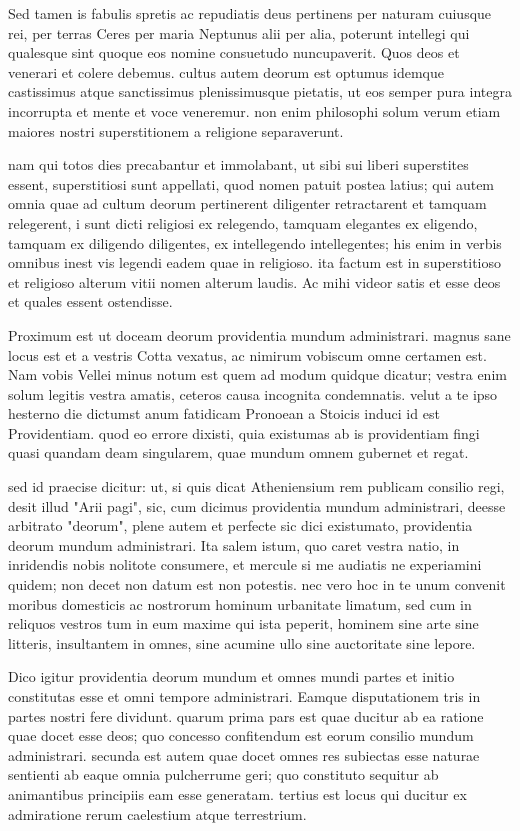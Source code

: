  Sed tamen is fabulis spretis ac repudiatis deus pertinens per naturam cuiusque rei, per terras Ceres per maria Neptunus alii per alia, poterunt intellegi qui qualesque sint quoque eos nomine consuetudo nuncupaverit. Quos deos et venerari et colere debemus. cultus autem deorum est optumus idemque castissimus atque sanctissimus plenissimusque pietatis, ut eos semper pura integra incorrupta et mente et voce veneremur. non enim philosophi solum verum etiam maiores nostri superstitionem a religione separaverunt.

 nam qui totos dies precabantur et immolabant, ut sibi sui liberi superstites essent, superstitiosi sunt appellati, quod nomen patuit postea latius; qui autem omnia quae ad cultum deorum pertinerent diligenter retractarent et tamquam relegerent, i sunt dicti religiosi ex relegendo, tamquam elegantes ex eligendo, tamquam ex diligendo diligentes, ex intellegendo intellegentes; his enim in verbis omnibus inest vis legendi eadem quae in religioso. ita factum est in superstitioso et religioso alterum vitii nomen alterum laudis. Ac mihi videor satis et esse deos et quales essent ostendisse.

 Proximum est ut doceam deorum providentia mundum administrari. magnus sane locus est et a vestris Cotta vexatus, ac nimirum vobiscum omne certamen est. Nam vobis Vellei minus notum est quem ad modum quidque dicatur; vestra enim solum legitis vestra amatis, ceteros causa incognita condemnatis. velut a te ipso hesterno die dictumst anum fatidicam Pronoean a Stoicis induci id est Providentiam. quod eo errore dixisti, quia existumas ab is providentiam fingi quasi quandam deam singularem, quae mundum omnem gubernet et regat.

 sed id praecise dicitur: ut, si quis dicat Atheniensium rem publicam consilio regi, desit illud "Arii pagi", sic, cum dicimus providentia mundum administrari, deesse arbitrato "deorum", plene autem et perfecte sic dici existumato, providentia deorum mundum administrari. Ita salem istum, quo caret vestra natio, in inridendis nobis nolitote consumere, et mercule si me audiatis ne experiamini quidem; non decet non datum est non potestis. nec vero hoc in te unum convenit moribus domesticis ac nostrorum hominum urbanitate limatum, sed cum in reliquos vestros tum in eum maxime qui ista peperit, hominem sine arte sine litteris, insultantem in omnes, sine acumine ullo sine auctoritate sine lepore.

 Dico igitur providentia deorum mundum et omnes mundi partes et initio constitutas esse et omni tempore administrari. Eamque disputationem tris in partes nostri fere dividunt. quarum prima pars est quae ducitur ab ea ratione quae docet esse deos; quo concesso confitendum est eorum consilio mundum administrari. secunda est autem quae docet omnes res subiectas esse naturae sentienti ab eaque omnia pulcherrume geri; quo constituto sequitur ab animantibus principiis eam esse generatam. tertius est locus qui ducitur ex admiratione rerum caelestium atque terrestrium.

